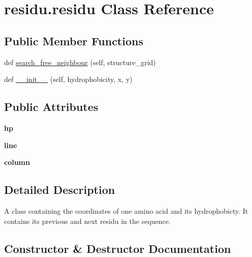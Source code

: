 \hypertarget{classresidu_1_1residu}{}\section{residu.\+residu Class Reference}
\label{classresidu_1_1residu}
\subsection*{Public Member Functions}
\begin{DoxyCompactItemize}
\item 
def \hyperlink{classresidu_1_1residu_a63505767ea98b9e6e17196019c07ce1b}{search\+\_\+free\+\_\+neighbour} (self, structure\+\_\+grid)
\item 
def \hyperlink{classresidu_1_1residu_a30216b9f76412426033dcd14fadad9e4}{\+\_\+\+\_\+init\+\_\+\+\_\+} (self, hydrophobicity, x, y)
\end{DoxyCompactItemize}
\subsection*{Public Attributes}
\begin{DoxyCompactItemize}
\item 
\mbox{\label{classresidu_1_1residu_afc7d129ad064dfec120862d4426f8e24}} 
{\bfseries hp}
\item 
\mbox{\label{classresidu_1_1residu_afa338fe84f0d017a0d23d018835897ee}} 
{\bfseries line}
\item 
\mbox{\label{classresidu_1_1residu_aef02a7e46e5cdbbf4190ebfc45b09206}} 
{\bfseries column}
\end{DoxyCompactItemize}


\subsection{Detailed Description}
\begin{DoxyVerb}A class containing the coordinates of one amino acid and its
hydrophobicty. It contains its previous and next residu in the sequence.
\end{DoxyVerb}
 

\subsection{Constructor \& Destructor Documentation}
\mbox{\label{classresidu_1_1residu_a30216b9f76412426033dcd14fadad9e4}} 
